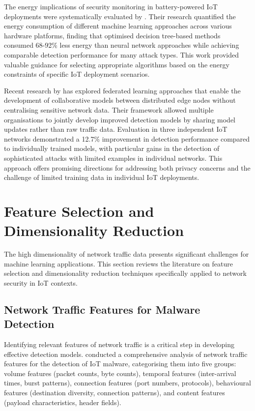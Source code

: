 The energy implications of security monitoring in battery-powered IoT deployments were systematically evaluated by \cite{Samie2020}. Their research quantified the energy consumption of different machine learning approaches across various hardware platforms, finding that optimised decision tree-based methods consumed 68-92\% less energy than neural network approaches while achieving comparable detection performance for many attack types. This work provided valuable guidance for selecting appropriate algorithms based on the energy constraints of specific IoT deployment scenarios.

Recent research by \cite{Shahraki2021} has explored federated learning approaches that enable the development of collaborative models between distributed edge nodes without centralising sensitive network data. Their framework allowed multiple organisations to jointly develop improved detection models by sharing model updates rather than raw traffic data. Evaluation in three independent IoT networks demonstrated a 12.7\% improvement in detection performance compared to individually trained models, with particular gains in the detection of sophisticated attacks with limited examples in individual networks. This approach offers promising directions for addressing both privacy concerns and the challenge of limited training data in individual IoT deployments.

\section{Feature Selection and Dimensionality Reduction}

The high dimensionality of network traffic data presents significant challenges for machine learning applications. This section reviews the literature on feature selection and dimensionality reduction techniques specifically applied to network security in IoT contexts.

\subsection{Network Traffic Features for Malware Detection}

Identifying relevant features of network traffic is a critical step in developing effective detection models. \cite{Mehrban2021} conducted a comprehensive analysis of network traffic features for the detection of IoT malware, categorising them into five groups: volume features (packet counts, byte counts), temporal features (inter-arrival times, burst patterns), connection features (port numbers, protocols), behavioural features (destination diversity, connection patterns), and content features (payload characteristics, header fields).

